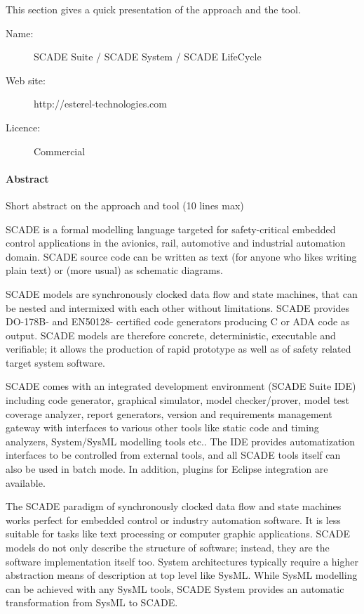 This section gives a quick presentation of the approach and the tool.

\begin{description}
\item[Name:] SCADE Suite / SCADE System / SCADE LifeCycle
\item[Web site: ] http://esterel-technologies.com 
\item[Licence: ] Commercial
\end{description}

\paragraph{Abstract} Short abstract on the approach and tool (10 lines max)

SCADE is a formal modelling language targeted for safety-critical embedded control applications
in the avionics, rail, automotive and industrial automation domain. SCADE source code can be
written as text (for anyone who likes writing plain text) or (more usual) as schematic diagrams.

SCADE models are synchronously clocked data flow and state machines, that can be nested
and intermixed with each other without limitations. SCADE provides DO-178B- and EN50128-
certified code generators producing C or ADA code as output. SCADE models are therefore concrete, deterministic, executable and verifiable; it allows the production of rapid prototype as
well as of safety related target system software.

SCADE comes with an integrated development environment (SCADE Suite IDE) including
code generator, graphical simulator, model checker/prover, model test coverage analyzer, report
generators, version and requirements management gateway with interfaces to various other tools
like static code and timing analyzers, System/SysML modelling tools etc.. The IDE provides
automatization interfaces to be controlled from external tools, and all SCADE tools itself can
also be used in batch mode. In addition, plugins for Eclipse integration are available.

The SCADE paradigm of synchronously clocked data flow and state machines works perfect for
embedded control or industry automation software. It is less suitable for tasks like text processing
or computer graphic applications. SCADE models do not only describe the structure of software;
instead, they are the software implementation itself too. System architectures typically require a
higher abstraction means of description at top level like SysML. While SysML modelling can
be achieved with any SysML tools, SCADE System provides an automatic transformation from
SysML to SCADE.

